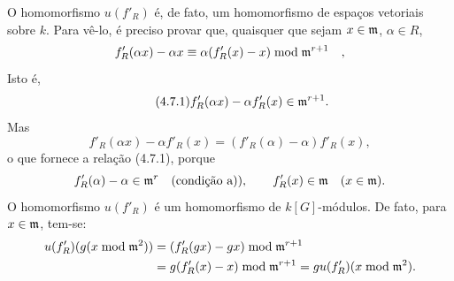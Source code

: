 O homomorfismo $u(f'_R)$ é, de fato, um homomorfismo de espaços vetoriais sobre $k$. Para vê-lo, é preciso provar que, quaisquer que sejam $x \in \mathfrak m$, $\alpha \in R$,
\[
f'_R(\alpha x) - \alpha x \equiv \alpha(f'_R(x) - x) \bmod \mathfrak m^{r+1} \quad ,
\]
Isto é,
\begin{equation}
\tag{4.7.1}
f'_R(\alpha x)-\alpha f'_R(x)\in\mathfrak m^{r+1}.
\end{equation}
Mas
\[
f'_R(\alpha x)-\alpha f'_R(x)=(f'_R(\alpha)-\alpha)f'_R(x),
\]
o que fornece a relação (4.7.1), porque
\[
f'_R(\alpha)-\alpha\in\mathfrak m^r\quad\hbox{(condição a))},
\qquad
f'_R(x)\in\mathfrak m\quad (x\in\mathfrak m).
\]
O homomorfismo $u(f'_R)$ é um homomorfismo de $k[G]$-módulos. De fato, para $x\in\mathfrak m$, tem-se:
\[
\begin{aligned}
u(f'_R)(g(x\bmod\mathfrak m^2))
&=(f'_R(gx)-gx)\bmod\mathfrak m^{r+1}\\
&=g(f'_R(x)-x)\bmod\mathfrak m^{r+1}
=gu(f'_R)(x\bmod\mathfrak m^2).
\end{aligned}
\]
